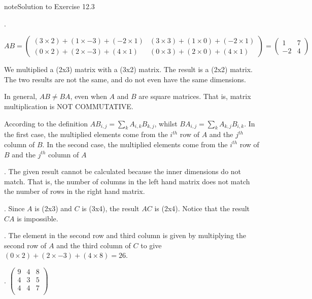 \documentclass[letterpaper,10pt,english]{jupyterBook}
\begin{document}
\begin{sphinxadmonition}{note}{Solution to Exercise 12.3}



.

\sphinxAtStartPar
\(A B=\left(\begin{array}{cc}(3\times 2)+(1 \times-3)+(-2\times 1) & (3\times 3)+(1\times 0)+(-2\times 1) \\ (0\times 2)+(2\times -3)+(4\times 1) & (0\times 3)+(2\times 0)+(4\times 1) \end{array}\right)=\left(\begin{array}{cc}1 & 7 \\-2 & 4 \end{array}\right)\)

\sphinxAtStartPar
We multiplied a (2x3) matrix with a (3x2) matrix. The result is a (2x2) matrix. The two results are not the same, and do not even have the same dimensions.

\sphinxAtStartPar
In general, \(A B\neq B A\), even when \(A\) and \(B\) are square matrices. That is, matrix multiplication is NOT COMMUTATIVE.

\sphinxAtStartPar
According to the definition \(A B_{i,j}= \sum _k A_{i,k} B_{k,j}\), whilst \(B A_{i,j}= \sum _k A_{k,j} B_{i,k}\). In the first case, the multiplied elements come from the \(i^{th}\) row of \(A\) and the \(j^{th}\) column of \(B\). In the second case, the multiplied elements come from the \(i^{th}\) row of \(B\) and the \(j^{th}\) column of \(A\)

. The given result cannot be calculated because the inner dimensions do not match. That is, the number of columns in the left hand matrix does not match the number of rows in the right hand matrix.

. Since \(A\) is (2x3) and \(C\) is (3x4), the result \(AC\) is (2x4). Notice that the result \(CA\) is impossible.

. The element in the second row and third column is given by multiplying the second row of \(A\) and the third column of \(C\) to give \((0\times 2)+(2 \times -3)+(4 \times8)=26\).

. \(\left(\begin{array}{ccc}9 & 4 & 8 \\4 & 3 & 5 \\4 & 4 & 7 \\\end{array}\right)\)
\end{sphinxadmonition}
 \label{LinearAlgebra/linear_systems_matrices/matrices:LinearAlgebra/linear_systems_matrices/matrices-solution-7}
\end{document}
